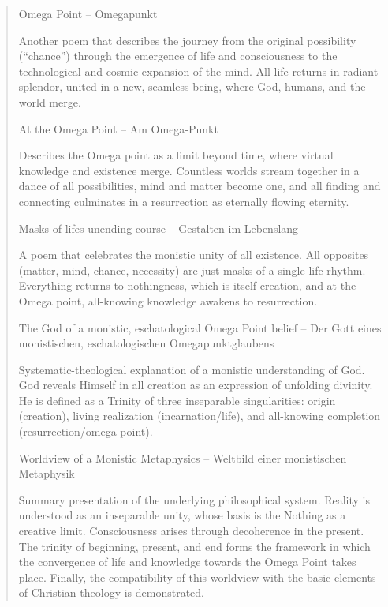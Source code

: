 \documentclass[
  ngerman,
]{article}
\begin{document}
\begin{quote}
Omega Point -- Omegapunkt

Another poem that describes the journey from the original possibility
(``chance'') through the emergence of life and consciousness to the
technological and cosmic expansion of the mind. All life returns in
radiant splendor, united in a new, seamless being, where God, humans,
and the world merge.

At the Omega Point -- Am Omega-Punkt

Describes the Omega point as a limit beyond time, where virtual
knowledge and existence merge. Countless worlds stream together in a
dance of all possibilities, mind and matter become one, and all finding
and connecting culminates in a resurrection as eternally flowing
eternity.

Masks of life\textquotesingle s unending course -- Gestalten im
Lebenslang

A poem that celebrates the monistic unity of all existence. All
opposites (matter, mind, chance, necessity) are just masks of a single
life rhythm. Everything returns to nothingness, which is itself
creation, and at the Omega point, all-knowing knowledge awakens to
resurrection.

The God of a monistic, eschatological Omega Point belief -- Der Gott
eines monistischen, eschatologischen Omegapunktglaubens

Systematic-theological explanation of a monistic understanding of God.
God reveals Himself in all creation as an expression of unfolding
divinity. He is defined as a Trinity of three inseparable singularities:
origin (creation), living realization (incarnation/life), and
all-knowing completion (resurrection/omega point).

Worldview of a Monistic Metaphysics -- Weltbild einer monistischen
Metaphysik

Summary presentation of the underlying philosophical system. Reality is
understood as an inseparable unity, whose basis is the
\textquotesingle Nothing\textquotesingle{} as a creative limit.
Consciousness arises through decoherence in the present. The trinity of
beginning, present, and end forms the framework in which the convergence
of life and knowledge towards the Omega Point takes place. Finally, the
compatibility of this worldview with the basic elements of Christian
theology is demonstrated.
\end{quote}

\section{\texorpdfstring{\hfill\break
}{ }}\label{section-2}
\end{document}
